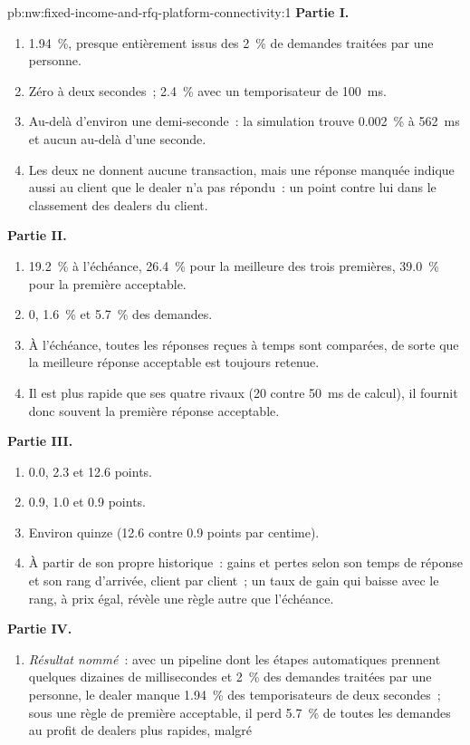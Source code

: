 \begin{solution}{pb:nw:fixed-income-and-rfq-platform-connectivity:1}
\textbf{Partie I.}
\begin{enumerate}
\item 1.94~\%, presque entièrement issus des 2~\% de demandes traitées par une personne.
\item Zéro à deux secondes~; 2.4~\% avec un temporisateur de \qty{100}{\milli\second}.
\item Au-delà d'environ une demi-seconde~: la simulation trouve 0.002~\% à \qty{562}{\milli\second} et aucun au-delà d'une seconde.
\item Les deux ne donnent aucune transaction, mais une réponse manquée indique aussi au client que le dealer n'a pas répondu~: un point contre lui dans le
  classement des dealers du client.
\end{enumerate}
\textbf{Partie II.}
\begin{enumerate}[resume]
\item 19.2~\% à l'échéance, 26.4~\% pour la meilleure des trois premières, 39.0~\% pour la première acceptable.
\item 0, 1.6~\% et 5.7~\% des demandes.
\item À l'échéance, toutes les réponses reçues à temps sont comparées, de sorte que la meilleure réponse acceptable est toujours retenue.
\item Il est plus rapide que ses quatre rivaux (20 contre \qty{50}{\milli\second} de calcul), il fournit donc souvent la première réponse acceptable.
\end{enumerate}
\textbf{Partie III.}
\begin{enumerate}[resume]
\item 0.0, 2.3 et 12.6 points.
\item 0.9, 1.0 et 0.9 points.
\item Environ quinze (12.6 contre 0.9 points par centime).
\item À partir de son propre historique~: gains et pertes selon son temps de réponse et son rang d'arrivée, client par client~; un taux de gain qui baisse avec le
  rang, à prix égal, révèle une règle autre que l'échéance.
\end{enumerate}
\textbf{Partie IV.}
\begin{enumerate}[resume]
\item \emph{Résultat nommé}~: avec un pipeline dont les étapes automatiques prennent quelques dizaines de millisecondes et 2~\% des demandes traitées par une personne,
  le dealer manque 1.94~\% des temporisateurs de deux secondes~; sous une règle de première acceptable, il perd 5.7~\% de toutes les demandes au profit de dealers plus rapides, malgré

\end{enumerate}
\end{solution}
